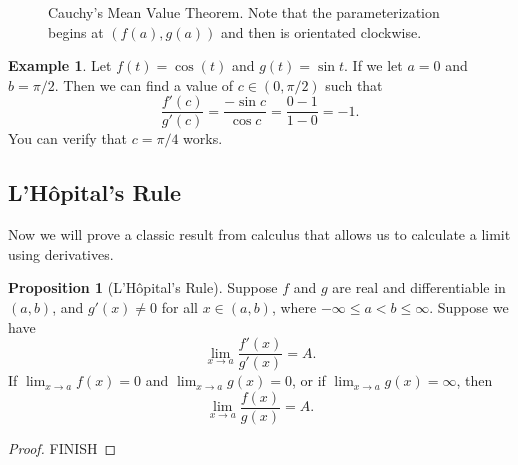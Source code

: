 \documentclass{article}
\newcommand{\R}{\mathbb{R}}
\theoremstyle{definition}
\newtheorem{proposition}{Proposition}[section]
\newtheorem{example}{Example}[section]
\begin{document}
	\begin{figure}[h!]
		\centering
		\caption{Cauchy's Mean Value Theorem. Note that the parameterization begins at $ (f(a),g(a)) $ and then is orientated clockwise.}
	\end{figure}
	\begin{example}
		Let $ f(t)=\cos (t) $ and $ g(t)=\sin t $. If we let $ a=0 $ and $ b=\pi/2 $. Then we can find a value of $ c\in(0,\pi/2) $ such that $$ \frac{f'(c)}{g'(c)}=\frac{-\sin c}{\cos c}=\frac{0-1}{1-0}=-1.$$ You can verify that $ c=\pi /4 $ works. 
	\end{example}
	\subsection{L'H\^{o}pital's Rule}
	Now we will prove a classic result from calculus that allows us to calculate a limit using derivatives.
	\begin{proposition}[L'H\^{o}pital's Rule]
		Suppose $ f $ and $ g $ are real and differentiable in $ (a,b) $, and $ g'(x)\neq 0 $ for all $ x\in(a,b) $, where $ -\infty\le a< b\le\infty $. Suppose we have $$\lim_{x\to a}\frac{f'(x)}{g'(x)}=A .$$ If $ \lim_{x\to a}f(x)=0 $ and $ \lim_{x\to a}g(x)=0$, or if $ \lim_{x\to a}g(x)=\infty $, then $$\lim_{x\to a}\frac{f(x)}{g(x)}=A . $$ 
	\end{proposition} 
	\begin{proof}
		{\color{red}FINISH}
	\end{proof}
\end{document}
